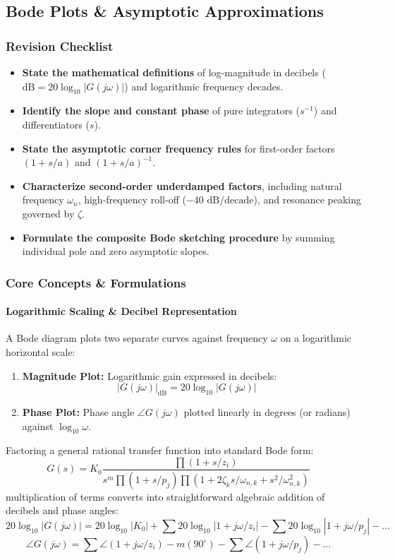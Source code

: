 \documentclass[12pt,onecolumn,twoside ]{article}
\begin{document}
	\subsection{Bode Plots \& Asymptotic Approximations}
	\subsubsection{Revision Checklist}
	\begin{itemize}
		\item[$\square$]
		\textbf{State the mathematical definitions} of log-magnitude in decibels ($\text{dB} = 20\log_{10}|G(j\omega)|$) and logarithmic frequency decades.
		\item[$\square$]
		\textbf{Identify the slope and constant phase} of pure integrators ($s^{-1}$) and differentiators ($s$).
		\item[$\square$]
		\textbf{State the asymptotic corner frequency rules} for first-order factors $(1 + s/a)$ and $(1 + s/a)^{-1}$.
		\item[$\square$]
		\textbf{Characterize second-order underdamped factors}, including natural frequency $\omega_n$, high-frequency roll-off ($-40\text{ dB/decade}$), and resonance peaking governed by $\zeta$.
		\item[$\square$]
		\textbf{Formulate the composite Bode sketching procedure} by summing individual pole and zero asymptotic slopes.
	\end{itemize}
	
	\subsubsection{Core Concepts \& Formulations}
	\paragraph{Logarithmic Scaling \& Decibel Representation}
	A Bode diagram plots two separate curves against frequency $\omega$ on a logarithmic horizontal scale:
	\begin{enumerate}
		\item
		\textbf{Magnitude Plot:} Logarithmic gain expressed in decibels: \[
		|G(j\omega)|_{\text{dB}} = 20 \log_{10}|G(j\omega)| \quad
		\]
		\item
		\textbf{Phase Plot:} Phase angle $\angle G(j\omega)$ plotted linearly in degrees (or radians) against $\log_{10}\omega$.
	\end{enumerate}
	Factoring a general rational transfer function into standard Bode form: \[
	G(s) = K_0 \frac{\prod (1 + s/z_i)}{s^m \prod (1 + s/p_j) \prod (1 + 2\zeta_k s/\omega_{n,k} + s^2/\omega_{n,k}^2)} \quad
	\] multiplication of terms converts into straightforward algebraic addition of decibels and phase angles: \[
	20\log_{10}|G(j\omega)| = 20\log_{10}|K_0| + \sum 20\log_{10}|1 + j\omega/z_i| - \sum 20\log_{10}|1 + j\omega/p_j| - \dots \quad
	\] \[
	\angle G(j\omega) = \sum \angle(1 + j\omega/z_i) - m(90^\circ) - \sum \angle(1 + j\omega/p_j) - \dots \quad
	\]
\end{document}
